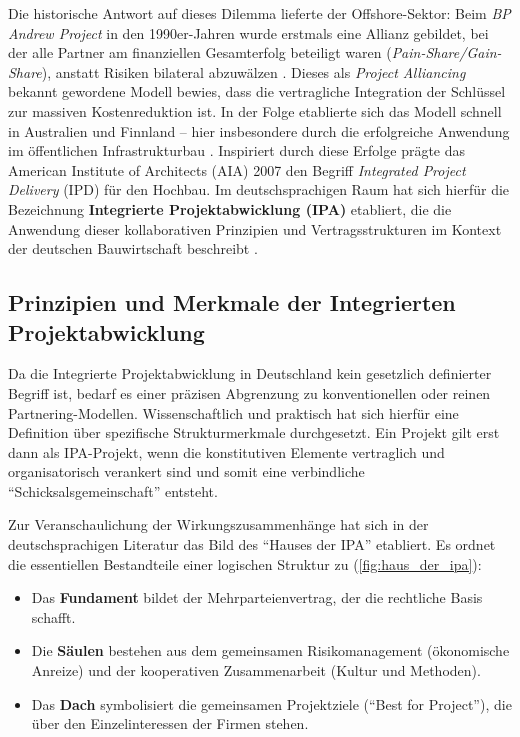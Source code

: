 Die historische Antwort auf dieses Dilemma lieferte der Offshore-Sektor: Beim \textit{BP Andrew Project} in den 1990er-Jahren wurde erstmals eine Allianz gebildet, bei der alle Partner am finanziellen Gesamterfolg beteiligt waren (\textit{Pain-Share/Gain-Share}), anstatt Risiken bilateral abzuwälzen \autocite[Vgl.][S.~2]{ross_introduction_2000}. Dieses als \textit{Project Alliancing} bekannt gewordene Modell bewies, dass die vertragliche Integration der Schlüssel zur massiven Kostenreduktion ist. In der Folge etablierte sich das Modell schnell in Australien und Finnland – hier insbesondere durch die erfolgreiche Anwendung im öffentlichen Infrastrukturbau \autocite[Vgl.][S.~58]{lahdenpera_making_2012}. Inspiriert durch diese Erfolge prägte das American Institute of Architects (AIA) 2007 den Begriff \textit{Integrated Project Delivery} (\acs{IPD}) für den Hochbau. \autocite[Vgl.][S.~2 f]{aia_integrated_2007} Im deutschsprachigen Raum hat sich hierfür die Bezeichnung \textbf{Integrierte Projektabwicklung (\acs{IPA})} etabliert, die die Anwendung dieser kollaborativen Prinzipien und Vertragsstrukturen im Kontext der deutschen Bauwirtschaft beschreibt \autocite[Vgl.][S.~28]{haghsheno_lean_2019}.


\subsection{Prinzipien und Merkmale der Integrierten Projektabwicklung}
\label{sec:2.2.2}

Da die Integrierte Projektabwicklung in Deutschland kein gesetzlich definierter Begriff ist, bedarf es einer präzisen Abgrenzung zu konventionellen oder reinen Partnering-Modellen. Wissenschaftlich und praktisch hat sich hierfür eine Definition über spezifische Strukturmerkmale durchgesetzt. Ein Projekt gilt erst dann als \acs{IPA}-Projekt, wenn die konstitutiven Elemente vertraglich und organisatorisch verankert sind und somit eine verbindliche \enquote{Schicksalsgemeinschaft} entsteht.

\clearpage

Zur Veranschaulichung der Wirkungszusammenhänge hat sich in der deutschsprachigen Literatur das Bild des \enquote{Hauses der \acs{IPA}} etabliert. Es ordnet die essentiellen Bestandteile einer logischen Struktur zu (\cref{fig:haus_der_ipa}): \autocite[Vgl.][S.~72]{haghsheno_strukturierungsansatz_2022}

\begin{itemize}
    \item Das \textbf{Fundament} bildet der Mehrparteienvertrag, der die rechtliche Basis schafft.
    \item Die \textbf{Säulen} bestehen aus dem gemeinsamen Risikomanagement (ökonomische Anreize) und der kooperativen Zusammenarbeit (Kultur und Methoden).
    \item Das \textbf{Dach} symbolisiert die gemeinsamen Projektziele (\enquote{Best for Project}), die über den Einzelinteressen der Firmen stehen.
\end{itemize}

